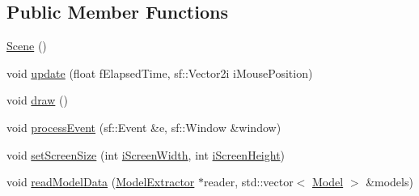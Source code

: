 \subsection*{Public Member Functions}
\begin{DoxyCompactItemize}
\item 
\hyperlink{class_scene_ad10176d75a9cc0da56626f682d083507}{Scene} ()
\item 
void \hyperlink{class_scene_a2984c9b32deff64e52a5c49744d90721}{update} (float f\+Elapsed\+Time, sf\+::\+Vector2i i\+Mouse\+Position)
\item 
void \hyperlink{class_scene_ac0e3d2c98ba6063a086467fb2c19142f}{draw} ()
\item 
void \hyperlink{class_scene_ab489a784acb0f14e1649f3970ea49195}{process\+Event} (sf\+::\+Event \&e, sf\+::\+Window \&window)
\item 
void \hyperlink{class_scene_aaffb708da35121468f9a66c626881052}{set\+Screen\+Size} (int \hyperlink{class_scene_a778137dcab836e6be4217615873db576}{i\+Screen\+Width}, int \hyperlink{class_scene_aac44019cbb3024de33132b0f278708f9}{i\+Screen\+Height})
\item 
void \hyperlink{class_scene_ac6c60d8e20f167e468e4bf5dc17ca68e}{read\+Model\+Data} (\hyperlink{class_model_extractor}{Model\+Extractor} $\ast$reader, std\+::vector$<$ \hyperlink{class_model}{Model} $>$ \&models)
\end{DoxyCompactItemize}
